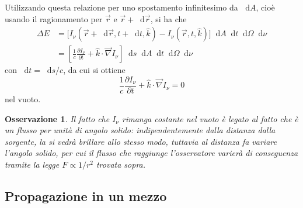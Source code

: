 \documentclass[11pt, a4paper]{scrartcl}
\theoremstyle{style}
\newtheorem{osservazione}{Osservazione}[section]
\theoremstyle{style1}
\newcommand{\dd}{\mathop{}\!\mathrm{d}}
\numberwithin{equation}{subsection}
\begin{document}
Utilizzando questa relazione per uno spostamento infinitesimo da $\dd A$, cio\`e usando il ragionamento per $\vec{r}$ e $\vec{r} + \dd\vec{r}$, si ha che 
\[
	\begin{split}
		\Delta E &= \Big[I_\nu (\vec{r}+\dd\vec{r}, t+\dd t , \hat{k}) - I_\nu (\vec{r},t,\hat{k})\Big] \dd A\dd t \dd\Omega \dd\nu \\
			 &= \left[ \frac{1}{c}\frac{\partial I_\nu }{\partial t} + \hat{k}\cdot \vec{\nabla }I_\nu  \right]  \dd s \dd A  \dd t \dd\Omega \dd\nu 
	\end{split}
\] 
con $\dd t = \dd s / c$, da cui si ottiene 
\begin{equation}
	\frac{1}{c} \frac{\partial I_\nu }{\partial t} + \hat{k}\cdot \vec{\nabla }I_\nu  = 0
\end{equation}
nel vuoto.
\begin{osservazione}
Il fatto che $I_\nu $ rimanga costante nel vuoto \`e legato al fatto che \`e un flusso per unit\`a di angolo solido: indipendentemente dalla distanza dalla sorgente, la si vedr\`a brillare allo stesso modo, tuttavia al distanza fa variare l'angolo solido, per cui il flusso che raggiunge l'osservatore varier\`a di conseguenza tramite la legge $F \propto 1 / r^2$ trovata sopra.
\end{osservazione}
\subsection{Propagazione in un mezzo}
\end{document}
